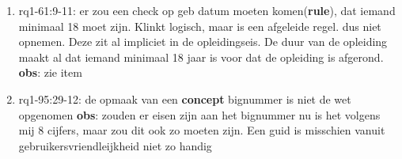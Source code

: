 \begin{enumerate}
    \item rq1-61:9-11: er zou een check op geb datum moeten komen(\textbf{rule}), dat iemand minimaal 18 moet zijn. 
    Klinkt logisch, maar is een afgeleide regel. 
    dus niet opnemen. 
    Deze zit al impliciet in de opleidingseis. 
    De duur van de opleiding maakt al dat iemand minimaal 18 jaar is voor dat de opleiding is afgerond.
    \newline\textbf{obs}: zie item
    
    \item rq1-95:29-12: de opmaak van een \textbf{concept} bignummer  is niet de wet opgenomen
    \newline\textbf{obs}: zouden er eisen zijn aan het bignummer nu is het volgens mij 8 cijfers, maar zou dit ook zo moeten zijn. 
    Een guid is misschien vanuit gebruikersvriendleijkheid niet zo handig
\end{enumerate}

